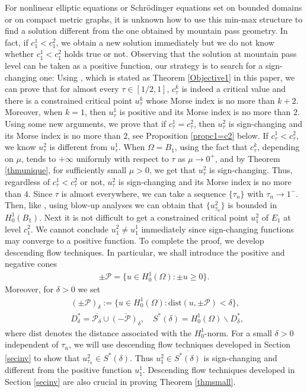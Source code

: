 \documentclass[10pt,a4paper]{article}
\theoremstyle{definition} \theoremstyle{remark}
\numberwithin{equation}{section}
\newcommand{\p}{\mathcal{P}}
\begin{document}
For nonlinear elliptic equations or Schr\"odinger equations set on bounded domains or on compact metric graphs, it is unknown how to use this min-max structure to find a solution different from the one obtained by mountain pass geometry. In fact, if $c_1^1 < c_1^2$, we obtain a new solution immediately but we do not know whether $c_1^1 < c_1^2$ holds true or not. Observing that the solution at mountain pass level can be taken as a positive function, our strategy is to search for a sign-changing one: Using \cite[Theorem 1.12]{BCJN}, which is stated as Theorem \ref{Objective1} in this paper, we can prove that for almost every $\tau \in [1/2,1]$, $c_\tau^k$ is indeed a critical value and there is a constrained critical point $u_\tau^k$ whose Morse index is no more than $k+2$. Moreover, when $k = 1$, then $u_\tau^1$ is positive and its Morse index is no more than $2$. Using some new arguments, we prove that if $c_\tau^1 = c_\tau^2$, then $u_\tau^2$ is sign-changing and its Morse index is no more than $2$, see Proposition \ref{propc1=c2} below. If $c_\tau^1 < c_\tau^2$, we know $u_\tau^2$ is different from $u_\tau^1$. When $\Omega = B_1$, using the fact that $c_\tau^k$, depending on $\mu$, tends to $+\infty$ uniformly with respect to $\tau$ as $\mu \to 0^+$, and by Theorem \ref{thmunique}, for sufficiently small $\mu > 0$, we get that $u_\tau^2$ is sign-changing. Thus, regardless of $c_\tau^1 < c_\tau^2$ or not, $u_\tau^2$ is sign-changing and its Morse index is no more than $4$. Since $\tau$ is almost everywhere, we can take a sequence $\{\tau_n\}$ with $\tau_n \to 1^-$. Then, like \cite{CJS}, using blow-up analyses we can obtain that $\{u_{\tau_n}^2\}$ is bounded in $H_0^1(B_1)$. Next it is not difficult to get a constrained critical point $u_1^2$ of $E_1$ at level $c_1^2$. We cannot conclude $u_1^2 \neq u_1^1$ immediately since sign-changing functions may converge to a positive function. To complete the proof, we develop descending flow techniques. In particular, we shall introduce the positive and negative cones
\begin{align}
	\pm \p = \bigl\{u \in H_0^1(\Omega): \pm u \geq 0\bigr\}.
\end{align}
Moreover, for $\delta > 0$ we set
\begin{align}
	& (\pm \p)_\delta := \bigl\{u \in H_0^1(\Omega): \text{dist}(u,\pm \p) < \delta\bigr\}, \\
	& D^*_\delta = \overline{\p_\delta} \cup \overline{(-\p)_\delta}, \quad S^*(\delta) = H_0^1(\Omega) \backslash D^*_\delta,
\end{align}
where $\text{dist}$ denotes the distance associated with the $H_0^1$-norm. For a small $\delta > 0$ independent of $\tau_n$, we will use descending flow techniques developed in Section \ref{secinv} to show that $u_{\tau_n}^2 \in S^*(\delta)$. Thus $u_1^2 \in \overline{S^*(\delta)}$ is sign-changing and different from the positive function $u_1^1$. Descending flow techniques developed in Section \ref{secinv} are also crucial in proving Theorem \ref{thmsmall}.
\end{document}
